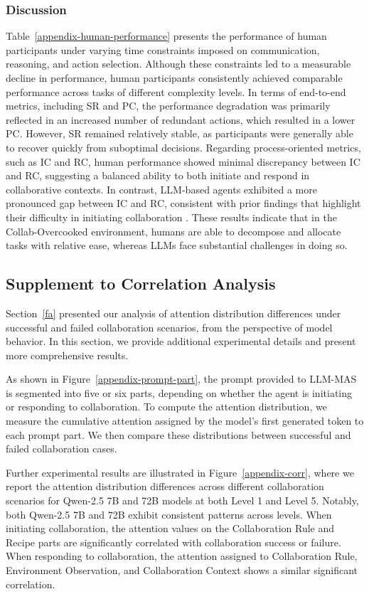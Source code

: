 \documentclass[11pt]{article}
\begin{document}
\subsubsection{Discussion}
Table~\ref{appendix-human-performance} presents the performance of human participants under varying time constraints imposed on communication, reasoning, and action selection. Although these constraints led to a measurable decline in performance, human participants consistently achieved comparable performance across tasks of different complexity levels. In terms of end-to-end metrics, including SR and PC, the performance degradation was primarily reflected in an increased number of redundant actions, which resulted in a lower PC. However, SR remained relatively stable, as participants were generally able to recover quickly from suboptimal decisions. Regarding process-oriented metrics, such as IC and RC, human performance showed minimal discrepancy between IC and RC, suggesting a balanced ability to both initiate and respond in collaborative contexts. In contrast, LLM-based agents exhibited a more pronounced gap between IC and RC, consistent with prior findings that highlight their difficulty in initiating collaboration \cite{li2023theory}. These results indicate that in the Collab-Overcooked environment, humans are able to decompose and allocate tasks with relative ease, whereas LLMs face substantial challenges in doing so. 


\subsection{Supplement to Correlation Analysis}
\label{appendix-corr-supp}

Section~\ref{fa} presented our analysis of attention distribution differences under successful and failed collaboration scenarios, from the perspective of model behavior. In this section, we provide additional experimental details and present more comprehensive results.

As shown in Figure~\ref{appendix-prompt-part}, the prompt provided to LLM-MAS is segmented into five or six parts, depending on whether the agent is initiating or responding to collaboration. To compute the attention distribution, we measure the cumulative attention assigned by the model's first generated token to each prompt part. We then compare these distributions between successful and failed collaboration cases.

Further experimental results are illustrated in Figure~\ref{appendix-corr}, where we report the attention distribution differences across different collaboration scenarios for Qwen-2.5 7B and 72B models at both Level 1 and Level 5. Notably, both Qwen-2.5 7B and 72B exhibit consistent patterns across levels. When initiating collaboration, the attention values on the Collaboration Rule and Recipe parts are significantly correlated with collaboration success or failure. When responding to collaboration, the attention assigned to Collaboration Rule, Environment Observation, and Collaboration Context shows a similar significant correlation.
\end{document}

